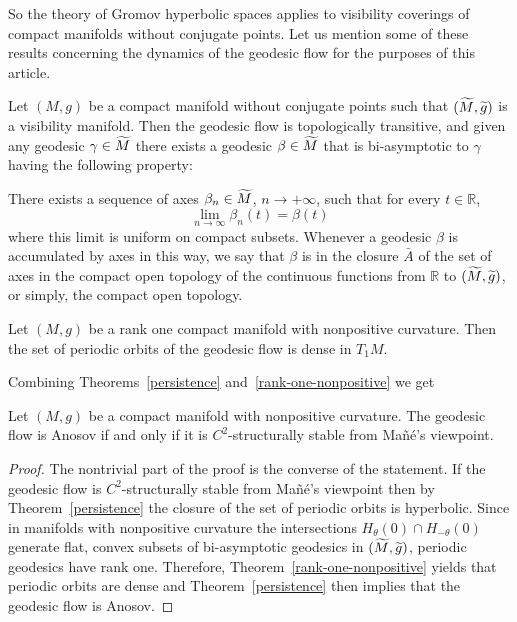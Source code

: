 \documentclass[AHL,Unicode,longabstracts,published]{cedram}
\newcommand{\bbR}{\mathbb{R}}
\let\oldtilde\tilde
\renewcommand*{\tilde}[1]{\mathchoice{\widetilde{#1}}{\widetilde{#1}}{\oldtilde{#1}}{\oldtilde{#1}}}
\begin{document}
So the theory of Gromov hyperbolic spaces applies to visibility coverings of compact manifolds without conjugate points. Let us mention some of these results concerning the dynamics of the geodesic flow for the purposes of this article.

\begin{theo}\label{rank-one-density}
Let $(M,g)$ be a compact manifold without conjugate points such that $(\tilde{M}, \tilde{g})$ is a visibility manifold. Then the geodesic flow is topologically transitive, and given any geodesic $\gamma \in \tilde{M}$ there exists a geodesic $\beta \in \tilde{M}$ that is bi-asymptotic to $\gamma$ having the following property:

There exists a sequence of axes $\beta_{n} \in \tilde{M}$, $n \rightarrow +\infty$, such that for every $t \in \bbR$,
\[
\lim_{n\rightarrow \infty}\beta_{n}(t) = \beta(t)
\]
where this limit is uniform on compact subsets. Whenever a geodesic $\beta$ is accumulated by axes in this way, we say that $\beta$ is in the closure $\bar{A}$ of the set of axes in the compact open topology of the continuous functions from $\bbR$ to $(\tilde{M}, \tilde{g})$, or simply, the compact open topology.
\end{theo}

\begin{theo}\label{rank-one-nonpositive}

Let $(M,g)$ be a rank one compact manifold with nonpositive curvature. Then the set of periodic orbits of the geodesic flow is dense in $T_{1}M$.
\end{theo}

Combining Theorems~\ref{persistence} and~\ref{rank-one-nonpositive} we get

\begin{coro}\label{rank-one-stability}
Let $(M,g)$ be a compact manifold with nonpositive curvature. The geodesic flow is Anosov if and only if it is $C^{2}$-structurally stable from Mañé's viewpoint.
\end{coro}

\begin{proof}
The nontrivial part of the proof is the converse of the statement. If the geodesic flow is $C^{2}$-structurally stable from Mañé's viewpoint then by Theorem~\ref{persistence} the closure of the set of periodic orbits is hyperbolic. Since in manifolds with nonpositive curvature the intersections $H_{\theta}(0) \cap H_{-\theta}(0)$ generate flat, convex subsets of bi-asymptotic geodesics in $(\tilde{M}, \tilde{g})$, periodic geodesics have rank one. Therefore, Theorem~\ref{rank-one-nonpositive} yields that periodic orbits are dense and Theorem~\ref{persistence} then implies that the geodesic flow is Anosov.
\end{proof}
\end{document}
